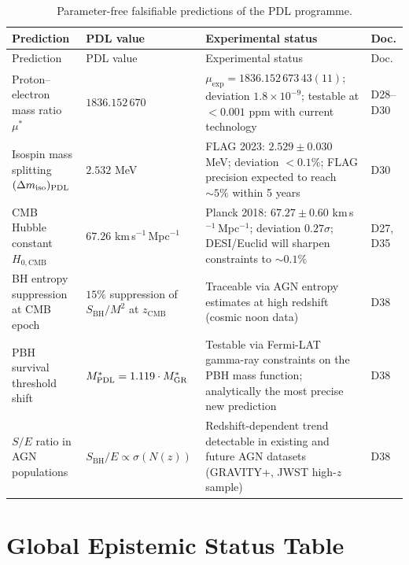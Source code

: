\documentclass[11pt,a4paper]{article}
\theoremstyle{plain}
\theoremstyle{definition}
\theoremstyle{remark}
\newcommand{\PDL}{\textnormal{PDL}}
\newcommand{\mustar}{\mu^*}
\newcommand{\SBH}{S_{\mathrm{BH}}}
\begin{document}
\begin{longtable}{@{}L{4.5cm}L{3.5cm}L{3.5cm}L{1.5cm}@{}}
\caption{Parameter-free falsifiable predictions of the PDL programme.}
\label{tab:predictions}\\
\toprule
Prediction & PDL value & Experimental status & Doc. \\
\midrule
\endfirsthead
\toprule
Prediction & PDL value & Experimental status & Doc. \\
\midrule
\endhead
\bottomrule
\endfoot

Proton--electron mass ratio $\mustar$ &
$1836.152\,670$ &
$\mu_{\exp}=1836.152\,673\,43(11)$; deviation $1.8\times10^{-9}$; testable at $<0.001$ ppm with current technology &
D28--D30 \\[0.4em]

Isospin mass splitting $(\Delta m_{\mathrm{iso}})_{\PDL}$ &
$2.532$ MeV &
FLAG 2023: $2.529\pm0.030$ MeV; deviation $<0.1\%$; FLAG precision expected to reach $\sim 5\%$ within 5 years &
D30 \\[0.4em]

CMB Hubble constant $H_{0,\mathrm{CMB}}$ &
$67.26$ km\,s$^{-1}$\,Mpc$^{-1}$ &
Planck 2018: $67.27\pm0.60$ km\,s$^{-1}$\,Mpc$^{-1}$; deviation $0.27\sigma$; DESI/Euclid will sharpen constraints to $\sim 0.1\%$ &
D27, D35 \\[0.4em]

BH entropy suppression at CMB epoch &
$15\%$ suppression of $\SBH/M^2$ at $z_{\mathrm{CMB}}$ &
Traceable via AGN entropy estimates at high redshift (cosmic noon data) &
D38 \\[0.4em]

PBH survival threshold shift &
$M^*_{\PDL} = 1.119\cdot M^*_{\mathrm{GR}}$ &
Testable via Fermi-LAT gamma-ray constraints on the PBH mass function; analytically the most precise new prediction &
D38 \\[0.4em]

$S/E$ ratio in AGN populations &
$S_{\mathrm{BH}}/E \propto \sigma(N(z))$ &
Redshift-dependent trend detectable in existing and future AGN datasets (GRAVITY+, JWST high-$z$ sample) &
D38 \\[0.4em]

\end{longtable}

\section{Global Epistemic Status Table}
\label{sec:status}
\end{document}
